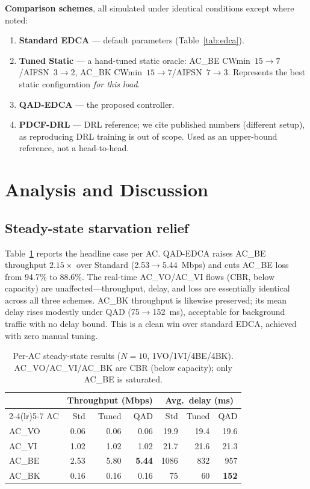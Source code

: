 \documentclass[conference]{IEEEtran}
\newcommand{\AC}[1]{AC\_#1}
\begin{document}
\textbf{Comparison schemes}, all simulated under identical conditions except
where noted:
\begin{enumerate}
\item \textbf{Standard EDCA} --- default parameters (Table~\ref{tab:edca}).
\item \textbf{Tuned Static} --- a hand-tuned static oracle: \AC{BE}
CWmin~$15{\rightarrow}7$/AIFSN~$3{\rightarrow}2$, \AC{BK}
CWmin~$15{\rightarrow}7$/AIFSN~$7{\rightarrow}3$. Represents the best static
configuration \emph{for this load}.
\item \textbf{QAD-EDCA} --- the proposed controller.
\item \textbf{PDCF-DRL} \cite{zuo} --- DRL reference; we cite published numbers
(different setup), as reproducing DRL training is out of scope. Used as an
upper-bound reference, not a head-to-head.
\end{enumerate}

\section{Analysis and Discussion}\label{sec:analysis}
\subsection{Steady-state starvation relief}
Table~\ref{tab:headline} reports the headline case per AC. QAD-EDCA raises
\AC{BE} throughput $2.15\times$ over Standard (2.53$\rightarrow$5.44~Mbps) and
cuts \AC{BE} loss from 94.7\% to 88.6\%. The real-time \AC{VO}/\AC{VI} flows
(CBR, below capacity) are unaffected---throughput, delay, and loss are
essentially identical across all three schemes. \AC{BK} throughput is likewise
preserved; its mean delay rises modestly under QAD (75$\rightarrow$152~ms),
acceptable for background traffic with no delay bound. This is a clean win over
standard EDCA, achieved with zero manual tuning.

\begin{table}[t]
\centering
\caption{Per-AC steady-state results ($N{=}10$, 1VO/1VI/4BE/4BK).
\AC{VO}/\AC{VI}/\AC{BK} are CBR (below capacity); only \AC{BE} is saturated.}
\label{tab:headline}
\setlength{\tabcolsep}{4pt}
\begin{tabular}{@{}lrrrrrr@{}}
\toprule
 & \multicolumn{3}{c}{Throughput (Mbps)} & \multicolumn{3}{c}{Avg.\ delay (ms)}\\
\cmidrule(lr){2-4}\cmidrule(lr){5-7}
AC & Std & Tuned & QAD & Std & Tuned & QAD\\
\midrule
\AC{VO} & 0.06 & 0.06 & 0.06 & 19.9 & 19.4 & 19.6\\
\AC{VI} & 1.02 & 1.02 & 1.02 & 21.7 & 21.6 & 21.3\\
\AC{BE} & 2.53 & 5.80 & \textbf{5.44} & 1086 & 832 & 957\\
\AC{BK} & 0.16 & 0.16 & 0.16 & 75 & 60 & \textbf{152}\\
\bottomrule
\end{tabular}
\end{table}
\end{document}
